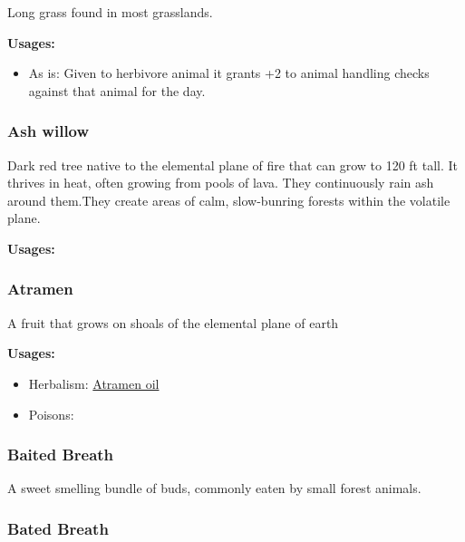 Long grass found in most grasslands.

\vspace{5mm}

\textbf{Usages:}

\begin{itemize}[noitemsep]
\item[] As is: Given to herbivore animal it grants +2 to animal handling checks against that animal for the day.
\end{itemize}

\subsubsection{Ash willow}
\label{Ash willow}

Dark red tree native to the elemental plane of fire that can grow to 120 ft tall. It thrives in heat, often growing from pools of lava. They continuously rain ash around them.They create areas of calm, slow-bunring forests within the volatile plane.

\vspace{5mm}

\textbf{Usages:}


\subsubsection{Atramen}
\label{Atramen}

A fruit that grows on shoals of the elemental plane of earth

\vspace{5mm}

\textbf{Usages:}

\begin{itemize}[noitemsep]
\item[] Herbalism: \hyperref[Atramen oil]{Atramen oil}
\item[] Poisons: \poison
\end{itemize}

\subsubsection{Baited Breath}
\label{baited_breath}

A sweet smelling bundle of buds, commonly eaten by small forest animals.

\subsubsection{Bated Breath}
\label{bated_breath}

